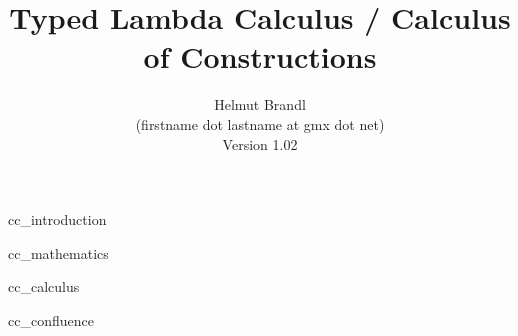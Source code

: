 \documentclass[12pt]{article}
\begin{document}


\title{
    Typed Lambda Calculus / Calculus of Constructions
}

\author{
    Helmut Brandl
    \\
    \scriptsize (firstname dot lastname at gmx dot net)
    \\
    \scriptsize Version 1.02
}
\date{}

\maketitle




\tableofcontents

 {cc_introduction}

 {cc_mathematics}

 {cc_calculus}

 {cc_confluence}






\end{document}
